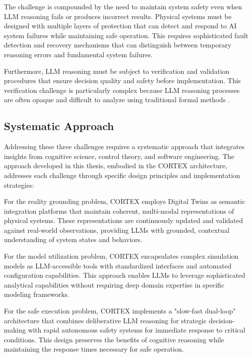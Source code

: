 The challenge is compounded by the need to maintain system safety even when LLM reasoning fails or produces incorrect results. Physical systems must be designed with multiple layers of protection that can detect and respond to AI system failures while maintaining safe operation. This requires sophisticated fault detection and recovery mechanisms that can distinguish between temporary reasoning errors and fundamental system failures.

Furthermore, LLM reasoning must be subject to verification and validation procedures that ensure decision quality and safety before implementation. This verification challenge is particularly complex because LLM reasoning processes are often opaque and difficult to analyze using traditional formal methods \cite{avizienis2004basic, powell1992delta}.

\subsection{Systematic Approach}

Addressing these three challenges requires a systematic approach that integrates insights from cognitive science, control theory, and software engineering. The approach developed in this thesis, embodied in the CORTEX architecture, addresses each challenge through specific design principles and implementation strategies:

For the reality grounding problem, CORTEX employs Digital Twins as semantic integration platforms that maintain coherent, multi-modal representations of physical systems. These representations are continuously updated and validated against real-world observations, providing LLMs with grounded, contextual understanding of system states and behaviors.

For the model utilization problem, CORTEX encapsulates complex simulation models as LLM-accessible tools with standardized interfaces and automated configuration capabilities. This approach enables LLMs to leverage sophisticated analytical capabilities without requiring deep domain expertise in specific modeling frameworks.

For the safe execution problem, CORTEX implements a "slow-fast dual-loop" architecture that combines deliberative LLM reasoning for strategic decision-making with rapid autonomous safety systems for immediate response to critical conditions. This design preserves the benefits of cognitive reasoning while maintaining the response times necessary for safe operation.

